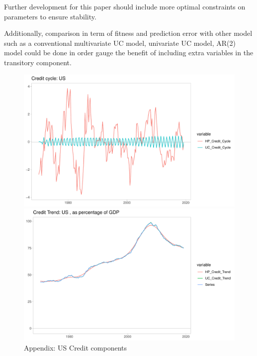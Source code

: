 \documentclass[fleqn]{article}
\begin{document}
\begin{outline}[enumerate]
Further development for this paper should include more optimal constraints on parameters to ensure stability. 

Additionally, comparison in term of fitness and prediction error with other model such as a conventional multivariate UC model, univariate UC model, AR(2) model could be done in order gauge the benefit of including extra variables in the transitory component.

\begin{figure}[h!]
\caption{Appendix: US Credit components}	
\centerline{\includegraphics[scale=0.7]{../Output/Graphs/Credit_cycle_US.pdf}}
\centerline{\includegraphics[scale=0.7]{../Output/Graphs/Credit_trend_US.pdf}}
\end{figure}


\end{outline}
\end{document}
